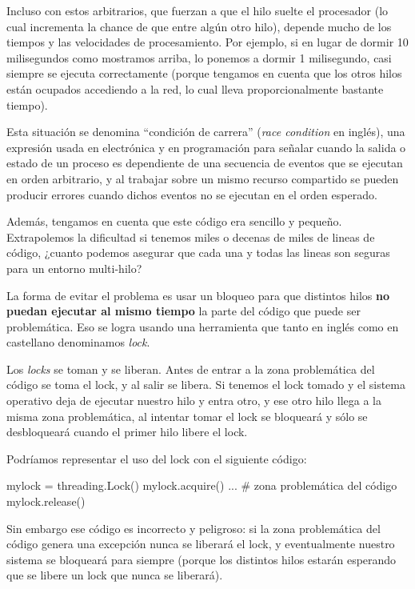 Incluso con estos  arbitrarios, que fuerzan a que el hilo suelte el procesador (lo cual incrementa la chance de que entre algún otro hilo), depende mucho de los tiempos y las velocidades de procesamiento. Por ejemplo, si en lugar de dormir 10 milisegundos como mostramos arriba, lo ponemos a dormir 1 milisegundo, casi siempre se ejecuta correctamente (porque tengamos en cuenta que los otros hilos están ocupados accediendo a la red, lo cual lleva proporcionalmente bastante tiempo).

Esta situación se denomina ``condición de carrera'' (\textit{race condition} en inglés), una expresión usada en electrónica y en programación para señalar cuando la salida o estado de un proceso es dependiente de una secuencia de eventos que se ejecutan en orden arbitrario, y al trabajar sobre un mismo recurso compartido se pueden producir errores cuando dichos eventos no se ejecutan en el orden esperado.

Además, tengamos en cuenta que este código era sencillo y pequeño. Extrapolemos la dificultad si tenemos miles o decenas de miles de lineas de código, ¿cuanto podemos asegurar que cada una y todas las lineas son seguras para un entorno multi-hilo?

La forma de evitar el problema es usar un bloqueo para que distintos hilos \textbf{no puedan ejecutar al mismo tiempo} la parte del código que puede ser problemática. Eso se logra usando una herramienta que tanto en inglés como en castellano denominamos \textit{lock}.

Los \textit{locks} se toman y se liberan. Antes de entrar a la zona problemática del código se toma el lock, y al salir se libera. Si tenemos el lock tomado y el sistema operativo deja de ejecutar nuestro hilo y entra otro, y ese otro hilo llega a la misma zona problemática, al intentar tomar el lock se bloqueará y sólo se desbloqueará cuando el primer hilo libere el lock.

Podríamos representar el uso del lock con el siguiente código:

\begin{py}
mylock = threading.Lock()
mylock.acquire()
... # zona problemática del código
mylock.release()
\end{py}

Sin embargo ese código es incorrecto y peligroso: si la zona problemática del código genera una excepción nunca se liberará el lock, y eventualmente nuestro sistema se bloqueará para siempre (porque los distintos hilos estarán esperando que se libere un lock que nunca se liberará).

